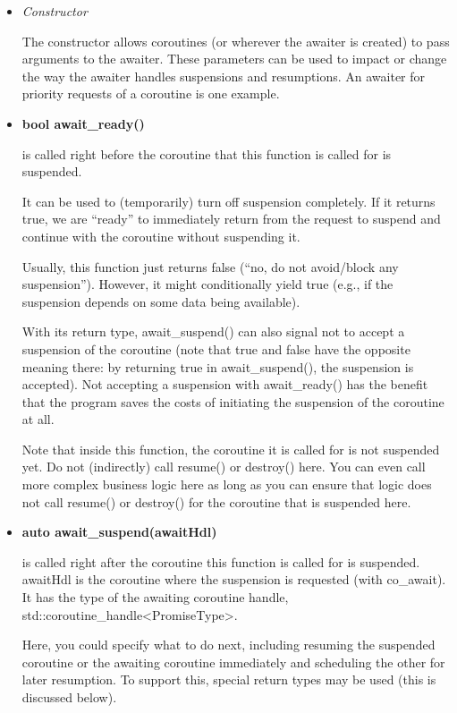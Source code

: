 \begin{itemize}
\item 
\textit{Constructor}

The constructor allows coroutines (or wherever the awaiter is created) to pass arguments to the awaiter. These parameters can be used to impact or change the way the awaiter handles suspensions and resumptions. An awaiter for priority requests of a coroutine is one example.

\item 
\textbf{bool await\_ready()}

is called right before the coroutine that this function is called for is suspended.

It can be used to (temporarily) turn off suspension completely. If it returns true, we are “ready” to immediately return from the request to suspend and continue with the coroutine without suspending it.

Usually, this function just returns false (“no, do not avoid/block any suspension”). However, it might conditionally yield true (e.g., if the suspension depends on some data being available).

With its return type, await\_suspend() can also signal not to accept a suspension of the coroutine (note that true and false have the opposite meaning there: by returning true in await\_suspend(), the suspension is accepted). Not accepting a suspension with await\_ready() has the benefit that the program saves the costs of initiating the suspension of the coroutine at all.

Note that inside this function, the coroutine it is called for is not suspended yet. Do not (indirectly) call resume() or destroy() here. You can even call more complex business logic here as long as you can ensure that logic does not call resume() or destroy() for the coroutine that is suspended here.

\item
\textbf{auto await\_suspend(awaitHdl)}

is called right after the coroutine this function is called for is suspended. awaitHdl is the coroutine where the suspension is requested (with co\_await). It has the type of the awaiting coroutine handle, std::coroutine\_handle<PromiseType>.

Here, you could specify what to do next, including resuming the suspended coroutine or the awaiting coroutine immediately and scheduling the other for later resumption. To support this, special return types may be used (this is discussed below).


\end{itemize}
